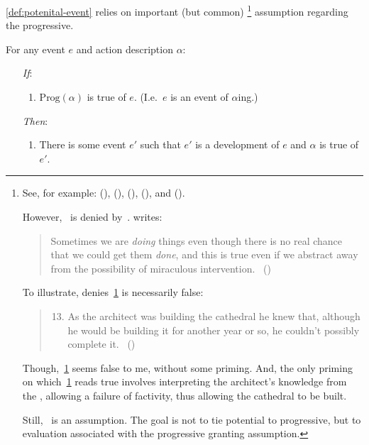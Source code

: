 \begin{note}
  \autoref{def:potenital-event} relies on important (but common)%
  \footnote{
    See, for example:
    (\cite{Bennett:1972uw}),
    (\cite{Dowty:1979vq}),
    (\cite{Parsons:1990aa}),
    (\cite{Landman:1992wh}), and
    (\cite{Portner:1998um}).

    However,~ is denied by~\textcite{Szabo:2004ul}.
    \citeauthor{Szabo:2004ul} writes:
    \begin{quote}
      Sometimes we are \emph{doing} things even though there is no real chance that we could get them \emph{done}, and this is true even if we abstract away from the possibility of miraculous intervention.%
      \mbox{ }\hfill\mbox{(\citeyear[40]{Szabo:2004ul})}
    \end{quote}
    To illustrate, \citeauthor{Szabo:2004ul} denies~\ref{Szabo:Arch} is necessarily false:
    \begin{quote}
      \begin{enumerate}[label=(\arabic*), ref=(\arabic*)]
        \setcounter{enumi}{12}
      \item
        \label{Szabo:Arch}
        As the architect was building the cathedral he knew that, although he would be building it for another year or so, he couldn't possibly complete it.%
        \mbox{ }\hfill\mbox{(\citeyear[38]{Szabo:2004ul})}
      \end{enumerate}
    \end{quote}
    Though,~\ref{Szabo:Arch} seems false to me, without some priming.
    And, the only priming on which~\ref{Szabo:Arch} reads true involves interpreting the architect's knowledge from the , allowing a failure of factivity, thus allowing the cathedral to be built.

    Still,~ is an assumption.
    The goal is not to tie potential to progressive, but to evaluation associated with the progressive granting assumption.
  }
  assumption regarding the progressive.

  \begin{assumption}[\assuPP{2}]
    \label{assu:PP}
    For any event \(e\) and action description \(\alpha\):
    \begin{enumerate}
    \item[\emph{If}:]
      \begin{enumerate}[label=\alph*., ref=(\alph*)]
      \item
        \(\text{Prog}(\alpha)\) is true of \(e\).%
        \hfill(I.e.\ \(e\) is an event of \(\alpha\)ing.)
      \end{enumerate}
    \item[\emph{Then}:]
      \begin{enumerate}[label=\alph*., ref=(\alph*), resume]
      \item
        There is some  event \(e'\) such that \(e'\) is a development of \(e\) and \(\alpha\) is true of \(e'\).
      \end{enumerate}
    \end{enumerate}
    \vspace{-\baselineskip}
  \end{assumption}


\end{note}

